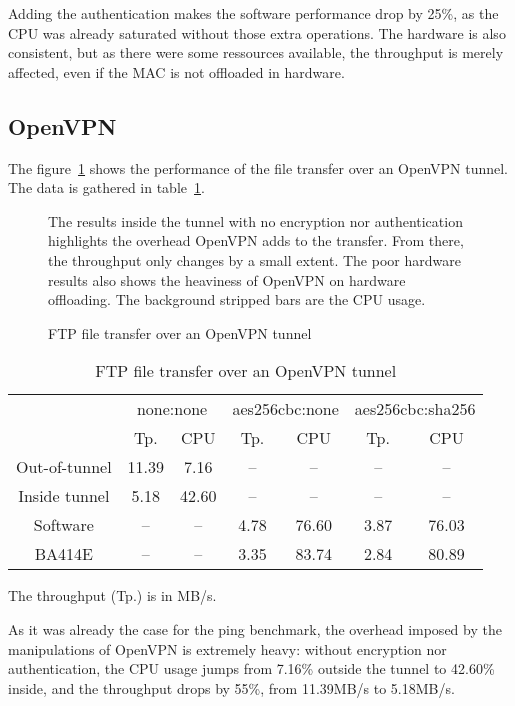 Adding the authentication makes the software performance drop by 25\%, as the CPU was already saturated without those extra operations.
The hardware is also consistent, but as there were some ressources available, the throughput is merely affected, even if the MAC is not offloaded in hardware.



\subsection{OpenVPN}
The figure~\ref{fig:openvpn-ftp-bench} shows the performance of the file transfer over an OpenVPN tunnel.
The data is gathered in table~\ref{tab:openvpn-ftp-bench}.

\begin{figure}[ht]

\caption{FTP file transfer over an OpenVPN tunnel}{The results inside the tunnel with no encryption nor authentication highlights the overhead OpenVPN adds to the transfer. From there, the throughput only changes by a small extent. The poor hardware results also shows the heaviness of OpenVPN on hardware offloading. The background stripped bars are the CPU usage.}
\label{fig:openvpn-ftp-bench}
\end{figure}

\begin{table}[ht]
\center
\small
\begin{tabular}{l|c|c|c|c|c|c|} \cline{2-7}
 & \multicolumn{2}{c|}{none:none} & \multicolumn{2}{c|}{aes256cbc:none} & \multicolumn{2}{c|}{aes256cbc:sha256} \\ \cline{2-7}
 & Tp.  & CPU & Tp.  & CPU & Tp.  & CPU \\ \hline
\multicolumn{1}{|c|}{Out-of-tunnel} & 11.39 & 7.16 & -- & -- & -- & -- \\ \hline
\multicolumn{1}{|c|}{Inside tunnel} & 5.18 & 42.60 & -- & -- & -- & -- \\ \hline
\multicolumn{1}{|c|}{Software} & -- & -- & 4.78 & 76.60 & 3.87 & 76.03 \\ \hline
\multicolumn{1}{|c|}{BA414E} & -- & -- & 3.35 & 83.74 & 2.84 & 80.89 \\ \hline
\end{tabular}
\caption{FTP file transfer over an OpenVPN tunnel}{The throughput (Tp.) is in MB/s.}
\label{tab:openvpn-ftp-bench}
\end{table}

As it was already the case for the ping benchmark, the overhead imposed by the manipulations of OpenVPN is extremely heavy: without encryption nor authentication, the CPU usage jumps from 7.16\% outside the tunnel to 42.60\% inside, and the throughput drops by 55\%, from 11.39MB/s to 5.18MB/s.

